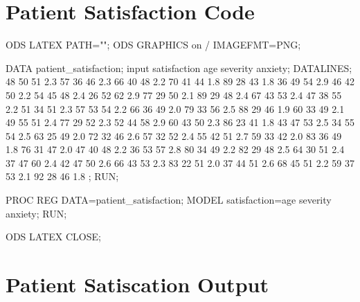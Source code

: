 
\begin{appendices}
\section{Patient Satisfaction Code} \label{app:pat_in}

\begin{SAScode}
ODS LATEX PATH="";
ODS GRAPHICS on / IMAGEFMT=PNG;

DATA patient_satisfaction;
input satisfaction age severity anxiety;
DATALINES;
48    50    51   2.3
  57    36    46   2.3
  66    40    48   2.2
  70    41    44   1.8
  89    28    43   1.8
  36    49    54   2.9
  46    42    50   2.2
  54    45    48   2.4
  26    52    62   2.9
  77    29    50   2.1
  89    29    48   2.4
  67    43    53   2.4
  47    38    55   2.2
  51    34    51   2.3
  57    53    54   2.2
  66    36    49   2.0
  79    33    56   2.5
  88    29    46   1.9
  60    33    49   2.1
  49    55    51   2.4
  77    29    52   2.3
  52    44    58   2.9
  60    43    50   2.3
  86    23    41   1.8
  43    47    53   2.5
  34    55    54   2.5
  63    25    49   2.0
  72    32    46   2.6
  57    32    52   2.4
  55    42    51   2.7
  59    33    42   2.0
  83    36    49   1.8
  76    31    47   2.0
  47    40    48   2.2
  36    53    57   2.8
  80    34    49   2.2
  82    29    48   2.5
  64    30    51   2.4
  37    47    60   2.4
  42    47    50   2.6
  66    43    53   2.3
  83    22    51   2.0
  37    44    51   2.6
  68    45    51   2.2
  59    37    53   2.1
  92    28    46   1.8
  ;
  RUN; 

  PROC REG DATA=patient_satisfaction;
  MODEL satisfaction=age severity anxiety;
  RUN;
  
  ODS LATEX CLOSE;
  
\end{SAScode}

\newpage

\section{Patient Satiscation Output} \label{app:pat_out}


\end{appendices}
